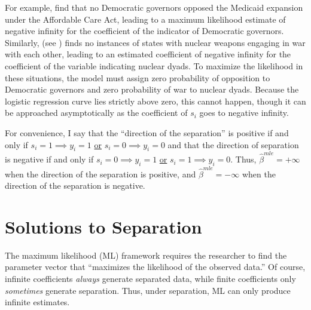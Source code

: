 \documentclass[12pt]{article}
\begin{document}
For example, \cite{BarrilleauxRainey2014} find that no Democratic governors opposed the Medicaid expansion under the Affordable Care Act, leading to a maximum likelihood estimate of negative infinity for the coefficient of the indicator of Democratic governors. 
Similarly, \cite{Rauchhaus2009} (see \citealt{BellMiller2015}) finds no instances of states with nuclear weapons engaging in war with each other, leading to an estimated coefficient of negative infinity for the coefficient of the variable indicating nuclear dyads. 
To maximize the likelihood in these situations, the model must assign zero probability of opposition to Democratic governors and zero probability of war to nuclear dyads. 
Because the logistic regression curve lies strictly above zero, this cannot happen, though it can be approached asymptotically as the coefficient of $s_i$ goes to negative infinity. 

For convenience, I say that the ``direction of the separation'' is positive if and only if $s_i = 1 \implies y_i = 1$ \underline{or} $s_i = 0 \implies y_i = 0$ and that the direction of separation is negative if and only if $s_i = 0 \implies y_i = 1$ \underline{or} $s_i = 1 \implies y_i = 0$. 
Thus, $\hat{\beta}^{mle} = +\infty$ when the direction of the separation is positive, and $\hat{\beta}^{mle} = -\infty$ when the direction of the separation is negative.

\section*{Solutions to Separation}

The maximum likelihood (ML) framework requires the researcher to find the parameter vector that ``maximizes the likelihood of the observed data.'' 
Of course, infinite coefficients \textit{always} generate separated data, while finite coefficients only \emph{sometimes} generate separation. 
Thus, under separation, ML can only produce infinite estimates.
\end{document}
